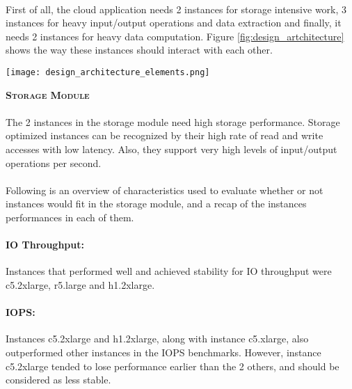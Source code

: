 \documentclass[11pt]{article}
\begin{document}
    	\paragraph{} First of all, the cloud application needs 2 instances for
    	storage intensive work, 3 instances for heavy input/output operations
    	and data extraction and finally, it needs 2 instances for heavy data
    	computation. Figure \ref{fig:design_artchitecture} shows the way these instances should
    	interact with each other. \cite{2}

		\begin{center}
			\begin{minipage}{0.8\textwidth}
				 \label{fig:design_artchitecture}
				\texttt{[image: design\_architecture\_elements.png]}
			\end{minipage}
		\end{center}

		\textsc{\Large{\textbf{Storage Module}}}

		\paragraph{} The 2 instances in the storage module need high storage
		performance. Storage optimized instances can be recognized by their high
		rate of read and write accesses with low latency. Also, they support very
		high levels of input/output operations per second. \cite{13}

		\paragraph{} Following is an overview of characteristics used to evaluate
		whether or not instances would fit in the storage module, and a recap of
		the instances performances in each of them.

		\paragraph{IO Throughput:} Instances that performed well and achieved
		stability for IO throughput were c5.2xlarge, r5.large and h1.2xlarge. 

		\paragraph{IOPS:} Instances c5.2xlarge and h1.2xlarge, along with
		instance c5.xlarge, also outperformed other instances in the IOPS
		benchmarks. However, instance c5.2xlarge tended to lose performance
		earlier than the 2 others, and should be considered as less stable.
\end{document}
